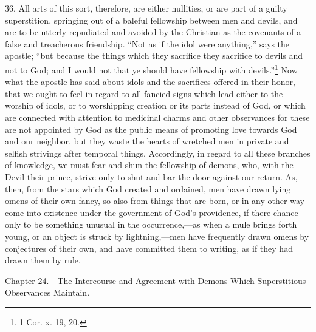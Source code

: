 36. All arts of this sort, therefore, are either nullities, or are part of a guilty superstition, springing out of a baleful fellowship between men and devils, and are to be utterly repudiated and avoided by the Christian as the covenants of a false and treacherous friendship. “Not as if the idol were anything,” says the apostle; “but because the things which they sacrifice they sacrifice to devils and not to God; and I would not that ye should have fellowship with devils.”\footnote{1 Cor. x. 19, 20.} Now what the apostle has said about idols and the sacrifices offered in their honor, that we ought to feel in regard to all fancied signs which lead either to the worship of idols, or to worshipping creation or its parts instead of God, or which are connected with attention to medicinal charms and other observances for these are not appointed by God as the public means of promoting love towards God and our neighbor, but they waste the hearts of wretched men in private and selfish strivings after temporal things. Accordingly, in regard to all these branches of knowledge, we must fear and shun the fellowship of demons, who, with the Devil their prince, strive only to shut and bar the door against our return. As, then, from the stars which God created and ordained, men have drawn lying omens of their own fancy, so also from things that are born, or in any other way come into existence under the government of God’s providence, if there chance only to be something unusual in the occurrence,—as when a mule brings forth young, or an object is struck by lightning,—men have frequently drawn omens by conjectures of their own, and have committed them to writing, as if they had drawn them by rule.


Chapter 24.—The Intercourse and Agreement with Demons Which Superstitious Observances Maintain.

